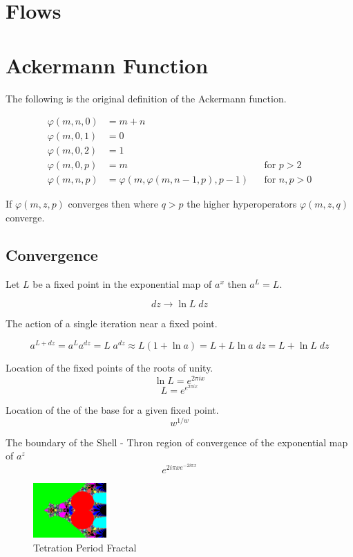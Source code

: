 \documentclass{article}
\theoremstyle{definition}
\begin{document}
\section{Flows}




\section{Ackermann Function}
The following is the original definition of the Ackermann function.

\begin{align}
\varphi(m, n, 0) &= m + n \\ \nonumber
\varphi(m, 0, 1) &= 0 \\ \nonumber
\varphi(m, 0, 2) &= 1 \\ \nonumber
\varphi(m, 0, p) &= m && \text{for } p > 2 \\ \nonumber
\varphi(m, n, p) &= \varphi(m, \varphi(m, n-1, p), p - 1) && \text{for } n, p > 0\nonumber
\end{align}

If $\varphi(m, z, p)$ converges then where $q>p$ the higher hyperoperators $\varphi(m, z, q)$ converge.

\subsection{Convergence}
Let $L$ be a fixed point in the exponential map of $a^x$ then $a^L=L$.

$${dz}\to\ln{L}\;{dz}$$

The action of a single iteration near a fixed point.

$$a^{L+dz}=a^L a^{dz}=L\;a^{dz}\approx L(1+\ln{a})=L+L\ln{a}\;{dz}=L+\ln{L}\;dz$$

Location of the fixed points of the roots of unity.
$$\ln{L}=e^{2 \pi i x}$$
$$L=e^{e^{2 \pi i x}}$$

Location of the of the base for a given fixed point.
$$w^{1/w}$$

The boundary of the Shell - Thron region of convergence of the exponential map of $a^z$
$$e^{2 i \pi  x e^{-2 i \pi  x}}$$

\begin{figure}[htp]
\centering
\includegraphics[width=0.25\textwidth]{period.png}
\caption{Tetration Period Fractal}
\label{fig:period}
\end{figure}
\end{document}
